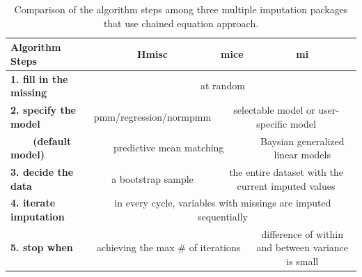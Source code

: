\documentclass[article]{jss}
\begin{document}
\begin{center}
\begin{table}[h]
\begin{centering}
\begin{tabular}{l|c|c|c}
\hline 
\textbf{\scriptsize{Algorithm Steps}} & \textbf{\scriptsize{Hmisc}} & \textbf{\scriptsize{mice}} & \textbf{\scriptsize{mi}}\tabularnewline
\hline 
\textbf{\scriptsize{1. fill in the missing}} & \multicolumn{3}{c}{{\scriptsize{at random}}}\tabularnewline
\hline 
\textbf{\scriptsize{2. specify the model}} & {\scriptsize{pmm/regression/normpmm}} & \multicolumn{2}{c}{{\scriptsize{selectable model or user-specific model}}}\tabularnewline
\hline 
\textbf{\scriptsize{~~~~(default model)}} & \multicolumn{2}{c|}{{\scriptsize{predictive mean matching}}} & {\scriptsize{Baysian generalized linear models}}\tabularnewline
\hline 
\textbf{\scriptsize{3. decide the data}} & {\scriptsize{a bootstrap sample}} & \multicolumn{2}{c}{{\scriptsize{the entire dataset with the current imputed values}}}\tabularnewline
\hline 
\textbf{\scriptsize{4. iterate imputation}} & \multicolumn{3}{c}{{\scriptsize{in every cycle, variables with missings are imputed sequentially}}}\tabularnewline
\hline 
\textbf{\scriptsize{5. stop when}} & \multicolumn{2}{c|}{{\scriptsize{achieving the max \# of iterations}}} & {\scriptsize{difference of within and between variance is small}}\tabularnewline
\hline 
\end{tabular}
\par\end{centering}
\caption{Comparison of the algorithm steps among three multiple imputation packages that use chained equation approach.}
\label{tab:compare-mi}
\end{table}
\par\end{center}
\end{document}
